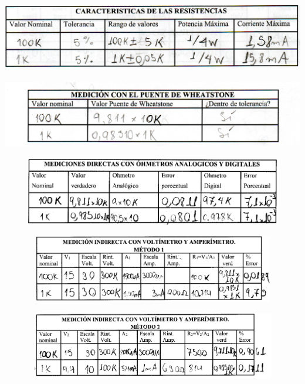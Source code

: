 \documentclass[12pt]{article}
\begin{document}
	\begin{center}
		\includegraphics[width=16cm,height=3cm]{Img/anexo_2}
	\end{center}

	\begin{center}
		\includegraphics[width=16cm,height=3cm]{Img/anexo_3}
	\end{center}
	
	\begin{center}
		\includegraphics[width=16cm,height=3cm]{Img/anexo_4}
	\end{center}

	\begin{center}
		\includegraphics[width=16cm,height=3cm]{Img/anexo_5}
	\end{center}

	\begin{center}
		\includegraphics[width=16cm,height=3cm]{Img/anexo_6}
	\end{center}
\end{document}
